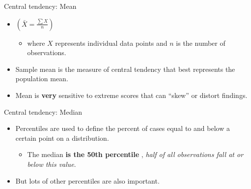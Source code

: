 \documentclass[
  ignorenonframetext,
]{beamer}
\providecommand{\tightlist}{%
  \setlength{\itemsep}{0pt}\setlength{\parskip}{0pt}}
\begin{document}
\begin{frame}{Central tendency: Mean}
\label{central-tendency-mean}
\begin{itemize}
\tightlist
\item
  \(\left( \bar{X} = \frac{\sum X}{n} \right)\)

  \begin{itemize}
  \tightlist
  \item
    where \(X\) represents individual data points and \(n\) is the
    number of observations.
  \end{itemize}
\end{itemize}

\begin{itemize}
\tightlist
\item
  Sample mean is the measure of central tendency that best represents
  the population mean.
\end{itemize}

\begin{itemize}
\tightlist
\item
  Mean is \textbf{very} sensitive to extreme scores that can ``skew'' or
  distort findings.
\end{itemize}
\end{frame}

\begin{frame}{Central tendency: Median}
\label{central-tendency-median}
\begin{itemize}
\tightlist
\item
  Percentiles are used to define the percent of cases equal to and below
  a certain point on a distribution.

  \begin{itemize}
  \tightlist
  \item
    The median \textbf{is the 50th percentile }, \emph{half of all
    observations fall at or below this value}.
  \end{itemize}
\end{itemize}

\begin{itemize}
\tightlist
\item
  But lots of other percentiles are also important.
\end{itemize}
\end{frame}
\end{document}
